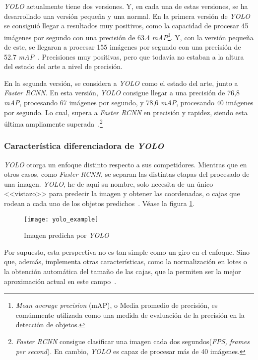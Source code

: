 \textit{YOLO} actualmente tiene dos versiones. Y, en cada una de estas versiones, se ha desarrollado una versión pequeña y una normal. En la primera versión de \textit{YOLO} se consiguió llegar a resultados muy positivos, como la capacidad de procesar 45 imágenes por segundo con una precisión de 63.4 \textit{mAP}\footnote{\textit{Mean average precision} (mAP), o Media promedio de precisión, es comúnmente utilizada como una medida de evaluación de la precisión en la detección de objetos.}. Y, con la versión pequeña de este, se llegaron a procesar 155 imágenes por segundo con una precisión de 52.7 \textit{mAP}~\cite{yolo}. Precisiones muy positivas, pero que todavía no estaban a la altura del estado del arte a nivel de precisión.

En la segunda versión, se considera a \textit{YOLO} como el estado del arte, junto a \textit{Faster RCNN}. En esta versión, \textit{YOLO} consigue llegar a una precisión de 76,8 \textit{mAP}, procesando 67 imágenes por segundo, y 78,6 \textit{mAP}, procesando 40 imágenes por segundo. Lo cual, supera a \textit{Faster RCNN} en precisión y rapidez, siendo esta última ampliamente superada~\cite{yolov2}.\footnote{\textit{Faster RCNN} consigue clasificar una imagen cada dos segundos(\textit{FPS, frames per second}). En cambio, \textit{YOLO} es capaz de procesar más de 40 imágenes.}

\subsubsection{Característica diferenciadora de \textit{YOLO}}

\textit{YOLO} otorga un enfoque distinto respecto a sus competidores. Mientras que en otros casos, como \textit{Faster RCNN}, se separan las distintas etapas del procesado de una imagen. \textit{YOLO}, he de aquí su nombre, solo necesita de un único <<vistazo>> para predecir la imagen y obtener las coordenadas, o cajas que rodean a cada uno de los objetos predichos~\cite{yolo}. Véase la figura \ref{fig:3.2.14}.

\begin{figure}[h]
\centering
\texttt{[image: yolo\_example]}
\caption{Imagen predicha por \textit{YOLO}}
\label{fig:3.2.14}
\end{figure}

Por supuesto, esta perspectiva no es tan simple como un giro en el enfoque. Sino que, además, implementa otras características, como la normalización en lotes o la obtención automática del tamaño de las cajas, que la permiten ser la mejor aproximación actual en este campo~\cite{yolov2}.

